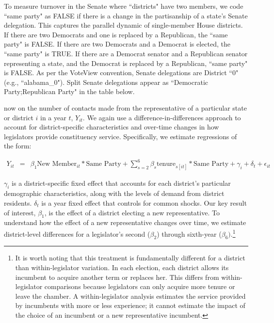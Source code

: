 To measure turnover in the Senate where ``districts" have two members, we code ``same party" as FALSE if there is a change in the partisanship of a state's Senate delegation. This captures the parallel dynamic of single-member House districts. If there are two Democrats and one is replaced by a Republican, the ``same party" is FALSE. If there are two Democrats and a Democrat is elected, the ``same party" is TRUE. If there are a Democrat senator and a Republican senator representing a state, and the Democrat is replaced by a Republican, ``same party" is FALSE. As per the VoteView convention, Senate delegations are District ``0" (e.g., ``alabama\_0"). Split Senate delegations appear as ``Democratic Party;Republican Party" in the table below.

now on the number of contacts made from the representative of a particular state or district $i$ in a year $t$, $Y_{it}$. We again use a difference-in-differences approach to account for district-specific characteristics and over-time changes in how legislators provide constituency service. Specifically, we estimate regressions of the form: 


\begin{eqnarray}
Y_{it} & = & \beta_{1}\text{New Member}_{it}*\text{Same Party} + \sum_{s = 2}^{6} \beta_{s} \text{tenure}_{s[it]}*\text{Same Party} + \gamma_{i} + \delta_{t} + \epsilon_{it} \label{e:district1party} 
\end{eqnarray}

$\gamma_{i}$ is a district-specific fixed effect that accounts for each district's particular demographic characteristics, along with the levels of demand from district residents. $\delta_{t}$ is a year fixed effect that controls for common shocks. Our key result of interest, $\beta_{1}$, is the effect of a district electing a new representative. To understand how the effect of a new representative changes over time, we estimate district-level differences for a legislator's second ($\beta_{2}$) through sixth-year ($\beta_{6})$.\footnote{It is worth noting that this treatment is fundamentally different for a district than within-legislator variation. In each election, each district allows its incumbent to acquire another term or replaces her. This differs from within-legislator comparisons because legislators can only acquire more tenure or leave the chamber. A within-legislator analysis estimates the service provided by incumbents with more or less experience; it cannot estimate the impact of the choice of an incumbent or a new representative incumbent.} %


